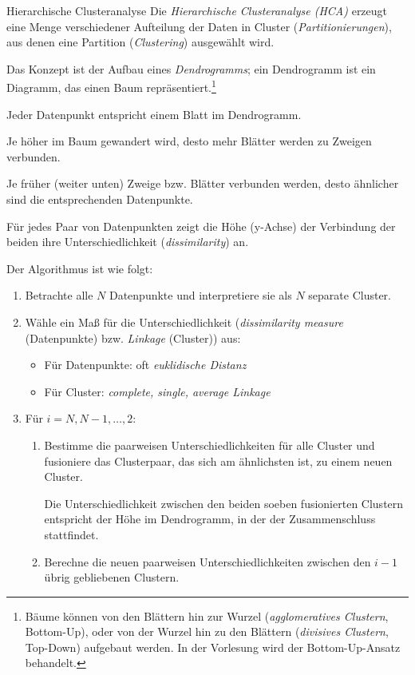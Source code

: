 \begin{defi}{Hierarchische Clusteranalyse}
    Die \emph{Hierarchische Clusteranalyse (HCA)} erzeugt eine Menge verschiedener Aufteilung der Daten in Cluster (\emph{Partitionierungen}), aus denen eine Partition (\emph{Clustering}) ausgewählt wird.

    Das Konzept ist der Aufbau eines \emph{Dendrogramms}; ein Dendrogramm ist ein Diagramm, das einen Baum repräsentiert.\footnote{Bäume können von den Blättern hin zur Wurzel (\emph{agglomeratives Clustern}, Bottom-Up), oder von der Wurzel hin zu den Blättern (\emph{divisives Clustern}, Top-Down) aufgebaut werden. In der Vorlesung wird der Bottom-Up-Ansatz behandelt.}

    Jeder Datenpunkt entspricht einem Blatt im Dendrogramm.

    Je höher im Baum gewandert wird, desto mehr Blätter werden zu Zweigen verbunden.

    Je früher (weiter unten) Zweige bzw. Blätter verbunden werden, desto ähnlicher sind die entsprechenden Datenpunkte.

    Für jedes Paar von Datenpunkten zeigt die Höhe (y-Achse) der Verbindung der beiden ihre Unterschiedlichkeit (\emph{dissimilarity}) an.

    Der Algorithmus ist wie folgt:
    \begin{enumerate}
        \item Betrachte alle $N$ Datenpunkte und interpretiere sie als $N$ separate Cluster.
        \item Wähle ein Maß für die Unterschiedlichkeit (\emph{dissimilarity measure} (Datenpunkte) bzw. \emph{Linkage} (Cluster)) aus:
              \begin{itemize}
                  \item Für Datenpunkte: oft \emph{euklidische Distanz}
                  \item Für Cluster: \emph{complete, single, average Linkage}
              \end{itemize}
        \item Für $i = N, N-1, \ldots, 2$:
              \begin{enumerate}
                  \item Bestimme die paarweisen Unterschiedlichkeiten für alle Cluster und fusioniere das Clusterpaar, das sich am ähnlichsten ist, zu einem neuen Cluster.

                        Die Unterschiedlichkeit zwischen den beiden soeben fusionierten Clustern entspricht der Höhe im Dendrogramm, in der der Zusammenschluss stattfindet.
                  \item Berechne die neuen paarweisen Unterschiedlichkeiten zwischen den $i-1$ übrig gebliebenen Clustern.
              \end{enumerate}
    \end{enumerate}
\end{defi}


